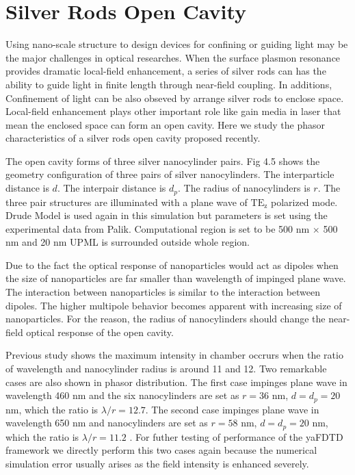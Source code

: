 \section{Silver Rods Open Cavity}
Using nano-scale structure to design devices for confining or guiding light may be the major challenges in optical
researches. When the surface plasmon resonance provides dramatic local-field enhancement, a series of silver rods can
has the ability to guide light in finite length through near-field coupling. In additions, Confinement of light can be
also obseved by arrange silver rods to enclose space. Local-field enhancement plays other important role like gain media
in laser that mean the enclosed space can form an open cavity. Here we study the phasor characteristics of a silver rods
open cavity proposed recently.

The open cavity forms of three silver nanocylinder pairs. Fig 4.5 shows the geometry configuration of three pairs of
silver nanocylinders. The interparticle distance is $d$. The interpair distance is $d_p$. The radius of nanocylinders is
$r$. The three pair structures are illuminated with a plane wave of $\mathrm{TE_z}$ polarized mode. Drude Model is used
again in this simulation but parameters is set using the experimental data from Palik. Computational region is set to be
500 nm $\times$ 500 nm and 20 nm UPML is surrounded outside whole region.

Due to the fact the optical response of nanoparticles would act as dipoles when the size of nanoparticles are far
smaller than wavelength of impinged plane wave. The interaction between nanoparticles is similar to the interaction
between dipoles. The higher multipole behavior becomes apparent with increasing size of nanoparticles. For the reason,
the radius of nanocylinders should change the near-field optical response of the open cavity.

Previous study shows the maximum intensity in chamber occrurs when the ratio of wavelength and nanocylinder radius is
around 11 and 12. Two remarkable cases are also shown in phasor distribution. The first case impinges plane wave in
wavelength 460 nm and the six nanocylinders are set as $r = 36$ nm, $d = d_p = 20$ nm, which the ratio is $\lambda /r
= 12.7$. The second case impinges plane wave in wavelength 650 nm and nanocylinders are set as $r = 58$ nm, $d = d_p =
20$ nm, which the ratio is $\lambda /r = 11.2$ . For futher testing of performance of the yaFDTD framework we directly
perform this two cases again because the numerical simulation error usually arises as the field intensity is enhanced
severely.

